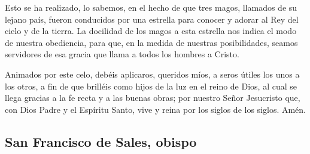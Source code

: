 \begin{body}
				Esto se ha realizado, lo sabemos, en el hecho de que tres magos, llamados de su lejano país, fueron conducidos por una estrella para conocer y adorar al Rey del cielo y de la tierra. La docilidad de los magos a esta estrella nos indica el modo de nuestra obediencia, para que, en la medida de nuestras posibilidades, seamos servidores de esa gracia que llama a todos los hombres a Cristo.
				
				Animados por este celo, debéis aplicaros, queridos míos, a seros útiles los unos a los otros, a fin de que brilléis como hijos de la luz en el reino de Dios, al cual se llega gracias a la fe recta y a las buenas obras; por nuestro Señor Jesucristo que, con Dios Padre y el Espíritu Santo, vive y reina por los siglos de los siglos. Amén.
			\end{body}
		

\newsection


		\subsection{San Francisco de Sales, obispo}
		
			
			
